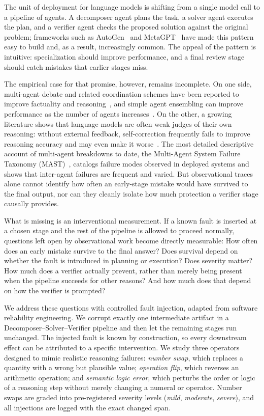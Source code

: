 \documentclass{article}
\begin{document}
The unit of deployment for language models is shifting from a single model
call to a pipeline of agents. A decomposer agent plans the task, a solver
agent executes the plan, and a verifier agent checks the proposed solution
against the original problem; frameworks such as AutoGen~\citep{wu2023autogen}
and MetaGPT~\citep{hong2023metagpt} have made this pattern easy to build and,
as a result, increasingly common. The appeal of the pattern is intuitive:
specialization should improve performance, and a final review stage should
catch mistakes that earlier stages miss.

The empirical case for that promise, however, remains incomplete. On one side,
multi-agent debate and related coordination schemes have been reported to
improve factuality and reasoning~\citep{du2023debate}, and simple agent
ensembling can improve performance as the number of agents
increases~\citep{li2024moreagents}. On the other, a growing literature shows
that language models are often weak judges of their own reasoning: without
external feedback, self-correction frequently fails to improve reasoning
accuracy and may even make it worse~\citep{huang2023selfcorrect}. The most
detailed descriptive account of multi-agent breakdowns to date, the
Multi-Agent System Failure Taxonomy (MAST)~\citep{cemri2025mast}, catalogs
failure modes observed in deployed systems and shows that inter-agent failures
are frequent and varied. But observational traces alone cannot identify how
often an early-stage mistake would have survived to the final output, nor can
they cleanly isolate how much protection a verifier stage causally provides.

What is missing is an interventional measurement. If a known fault is inserted
at a chosen stage and the rest of the pipeline is allowed to proceed normally,
questions left open by observational work become directly measurable: How
often does an early mistake survive to the final answer? Does survival depend
on whether the fault is introduced in planning or execution? Does severity
matter? How much does a verifier actually prevent, rather than merely being
present when the pipeline succeeds for other reasons? And how much does that
depend on how the verifier is prompted?

We address these questions with controlled fault injection, adapted from
software reliability engineering. We corrupt exactly one intermediate artifact
in a Decomposer--Solver--Verifier pipeline and then let the remaining stages
run unchanged. The injected fault is known by construction, so every
downstream effect can be attributed to a specific intervention. We study three
operators designed to mimic realistic reasoning failures: \emph{number swap},
which replaces a quantity with a wrong but plausible value; \emph{operation
flip}, which reverses an arithmetic operation; and \emph{semantic logic
error}, which perturbs the order or logic of a reasoning step without merely
changing a numeral or operator. Number swaps are graded into pre-registered
severity levels (\emph{mild}, \emph{moderate}, \emph{severe}), and all
injections are logged with the exact changed span.
\end{document}
